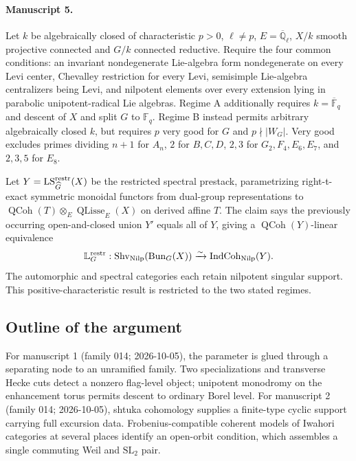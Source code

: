 \documentclass[11pt]{article}
\begin{document}
\paragraph{Manuscript 5.}
Let $k$ be algebraically closed of characteristic $p>0$, $\ell\ne p$, $E=\overline{\mathbb Q}_{\ell}$, $X/k$ smooth projective connected and $G/k$ connected reductive. Require the four common conditions: an invariant nondegenerate Lie-algebra form nondegenerate on every Levi center, Chevalley restriction for every Levi, semisimple Lie-algebra centralizers being Levi, and nilpotent elements over every extension lying in parabolic unipotent-radical Lie algebras. Regime A additionally requires $k=\overline{\mathbb F}_q$ and descent of $X$ and split $G$ to $\mathbb F_q$. Regime B instead permits arbitrary algebraically closed $k$, but requires $p$ very good for $G$ and $p\nmid|W_G|$. Very good excludes primes dividing $n+1$ for $A_n$, $2$ for $B,C,D$, $2,3$ for $G_2,F_4,E_6,E_7$, and $2,3,5$ for $E_8$.

Let $Y=\operatorname{LS}_{\widehat G}^{\rm restr}(X)$ be the restricted spectral prestack, parametrizing right-t-exact symmetric monoidal functors from dual-group representations to $\operatorname{QCoh}(T)\otimes_E\operatorname{QLisse}_E(X)$ on derived affine $T$. The claim says the previously occurring open-and-closed union $Y'$ equals all of $Y$, giving a $\operatorname{QCoh}(Y)$-linear equivalence
\[
 \mathbb L_G^{\rm restr}:\operatorname{Shv}_{\rm Nilp}(\operatorname{Bun}_G(X))
 \xrightarrow{\sim}\operatorname{IndCoh}_{\rm Nilp}(Y).
\]
The automorphic and spectral categories each retain nilpotent singular support. This positive-characteristic result is restricted to the two stated regimes.

\subsection{Outline of the argument}
For manuscript 1 (family 014; 2026-10-05), the parameter is glued through a separating node to an unramified family. Two specializations and transverse Hecke cuts detect a nonzero flag-level object; unipotent monodromy on the enhancement torus permits descent to ordinary Borel level. For manuscript 2 (family 014; 2026-10-05), shtuka cohomology supplies a finite-type cyclic support carrying full excursion data. Frobenius-compatible coherent models of Iwahori categories at several places identify an open-orbit condition, which assembles a single commuting Weil and $\mathrm{SL}_2$ pair.
\end{document}
